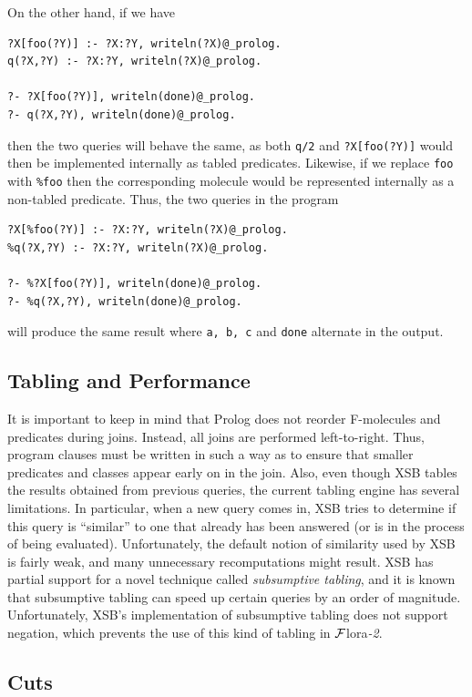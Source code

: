 \documentclass[11pt]{article}
\newcommand{\FLORA}{{\mbox{\sc ${\cal F}${lora}\rm\emph{-2}}}\xspace}
\begin{document}
On the other hand, if we have
\begin{verbatim}
?X[foo(?Y)] :- ?X:?Y, writeln(?X)@_prolog.
q(?X,?Y) :- ?X:?Y, writeln(?X)@_prolog.

?- ?X[foo(?Y)], writeln(done)@_prolog.
?- q(?X,?Y), writeln(done)@_prolog.
\end{verbatim}
then the two queries will behave the same, as both {\tt q/2} and
\verb|?X[foo(?Y)]| would then be implemented internally as tabled predicates.
Likewise, if we replace {\tt foo} with {\tt \%foo} then the corresponding
molecule would be represented internally as a non-tabled predicate.
Thus, the two queries in the program
\begin{verbatim}
?X[%foo(?Y)] :- ?X:?Y, writeln(?X)@_prolog.
%q(?X,?Y) :- ?X:?Y, writeln(?X)@_prolog.

?- %?X[foo(?Y)], writeln(done)@_prolog.
?- %q(?X,?Y), writeln(done)@_prolog.
\end{verbatim}
will produce the same result where {\tt a, b, c} and {\tt done}
alternate in the output.

\subsection{Tabling and Performance}

It is important to keep in mind that Prolog does not reorder F-molecules
and predicates during joins. Instead, all joins are performed
left-to-right.  Thus, program clauses must be written in such a way as to
ensure that smaller predicates and classes appear early on in the join.
Also, even though XSB tables the results obtained from previous queries,
the current tabling engine has several limitations. In particular, when a
new query comes in, XSB tries to determine if this query is ``similar'' to
one that already has been answered (or is in the process of being
evaluated).  Unfortunately, the default notion of similarity used by XSB is
fairly weak, and many unnecessary recomputations might result. XSB has
partial support for a
novel technique called \emph{subsumptive tabling}, and
it is known that subsumptive tabling can speed up
certain queries by an order of magnitude. Unfortunately, XSB's implementation
of subsumptive tabling does not support negation, which prevents
the use of this kind of tabling in \FLORA.


\subsection{Cuts}
\end{document}
